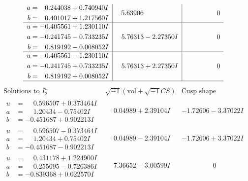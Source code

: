 \documentclass[1p]{elsarticle_modified}
\theoremstyle{definition}
\newcommand{\I}{\sqrt{-1}}
\begin{document}
$$\begin{array}{c|c|c}
\begin{aligned}
a &= \phantom{-}0.244038 + 0.740940 I \\
b &= \phantom{-}0.401017 + 1.217560 I\end{aligned}
 & \phantom{-}5.63906\phantom{ +0.000000I} & \phantom{-0.000000 } 0 \\ \hline\begin{aligned}
u &= -0.405561 + 1.230110 I \\
a &= -0.241745 - 0.733235 I \\
b &= \phantom{-}0.819192 - 0.008052 I\end{aligned}
 & \phantom{-}5.76313 - 2.27350 I & \phantom{-0.000000 } 0 \\ \hline\begin{aligned}
u &= -0.405561 - 1.230110 I \\
a &= -0.241745 + 0.733235 I \\
b &= \phantom{-}0.819192 + 0.008052 I\end{aligned}
 & \phantom{-}5.76313 + 2.27350 I & \phantom{-0.000000 } 0\\
 \hline 
 \end{array}$$\newpage$$\begin{array}{c|c|c}  
\text{Solutions to }I^u_{2}& \I (\text{vol} + \sqrt{-1}CS) & \text{Cusp shape}\\
 \hline 
\begin{aligned}
u &= \phantom{-}0.596507 + 0.373464 I \\
a &= \phantom{-}1.20434 - 0.75402 I \\
b &= -0.451687 + 0.902213 I\end{aligned}
 & \phantom{-}0.04989 + 2.39104 I & -1.72606 - 3.37022 I \\ \hline\begin{aligned}
u &= \phantom{-}0.596507 - 0.373464 I \\
a &= \phantom{-}1.20434 + 0.75402 I \\
b &= -0.451687 - 0.902213 I\end{aligned}
 & \phantom{-}0.04989 - 2.39104 I & -1.72606 + 3.37022 I \\ \hline\begin{aligned}
u &= \phantom{-}0.431178 + 1.224900 I \\
a &= \phantom{-}0.255695 - 0.726386 I \\
b &= -0.839368 + 0.022570 I\end{aligned}
 & \phantom{-}7.36652 - 3.00599 I & \phantom{-0.000000 } 0 \\ \hline\begin{aligned}

\end{aligned}
\end{array}$$
\end{document}
